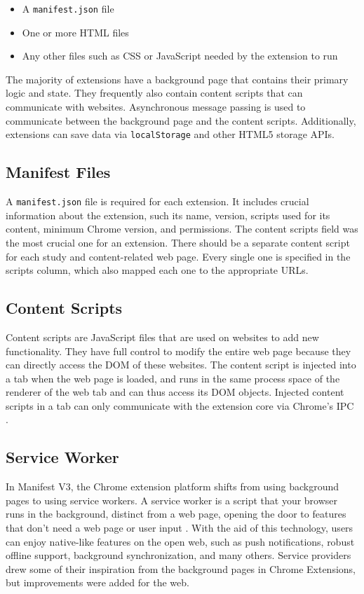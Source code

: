 \begin{itemize}
  \item A \texttt{manifest.json} file
  \item One or more HTML files
  \item Any other files such as CSS or JavaScript needed by the extension to run
\end{itemize}

The majority of extensions have a background page that contains their primary logic and state. They frequently also contain content scripts that can communicate with websites. Asynchronous message passing is used to communicate between the background page and the content scripts. Additionally, extensions can save data via \texttt{localStorage} and other HTML5 storage APIs.

\subsection{Manifest Files}
A \texttt{manifest.json} file is required for each extension. It includes crucial information about the extension, such its name, version, scripts used for its content, minimum Chrome version, and permissions. The content scripts field was the most crucial one for an extension. There should be a separate content script for each study and content-related web page. Every single one is specified in the scripts column, which also mapped each one to the appropriate URLs.

\subsection{Content Scripts}
Content scripts are JavaScript files that are used on websites to add new functionality. They have full control to modify the entire web page because they can directly access the DOM of these websites. The content script is injected into a tab when the web page is loaded, and runs in the same process space of the renderer of the web tab and can thus access its DOM objects. Injected content scripts in a tab can only communicate with the extension core via Chrome's IPC \autocite{liu2012chrome}.

\subsection{Service Worker}
\label{service_worker}
In Manifest V3, the Chrome extension platform shifts from using background pages to using service workers. A service worker is a script that your browser runs in the background, distinct from a web page, opening the door to features that don't need a web page or user input \autocite{chrome2021service}. With the aid of this technology, users can enjoy native-like features on the open web, such as push notifications, robust offline support, background synchronization, and many others. Service providers drew some of their inspiration from the background pages in Chrome Extensions, but improvements were added for the web.

